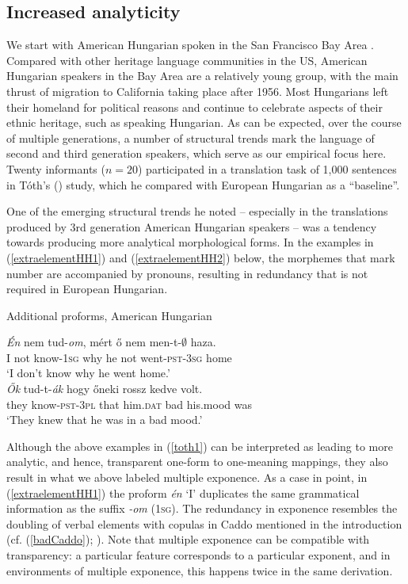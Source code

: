\documentclass[output=paper,colorlinks,citecolor=brown,footheight=42pt]{langscibook}
\begin{document}
\subsection{Increased analyticity} \label{analsub}
We start with American Hungarian spoken in the San Francisco Bay Area \citep{toth2007hungry}. Compared with other heritage language communities in the US, American Hungarian speakers in the Bay Area are a relatively young group, with the main thrust of migration to California taking place after 1956. Most Hungarians left their homeland for political reasons and continue to celebrate aspects of their ethnic heritage, such as speaking Hungarian. As can be expected, over the course of multiple generations, a number of structural trends mark the language of second and third generation speakers, which serve as our empirical focus here. Twenty informants ($n=20$) participated in a translation task of 1,000 sentences in T\'{o}th's (\citeyear{toth2007hungry}) study, which he compared with European Hungarian as a “baseline”.

One of the emerging structural trends he noted -- especially in the translations produced by 3rd generation American Hungarian speakers -- was a tendency towards producing more analytical morphological forms. In the examples in (\ref{extraelementHH1}) and (\ref{extraelementHH2}) below, the morphemes that mark number are accompanied by pronouns, resulting in redundancy that is not required in European Hungarian. 

\begin{exe}
\ex Additional proforms, American Hungarian  \citep[169]{toth2007hungry} \label{toth1}
\begin{xlist}
\ex\label{extraelementHH1}
\gll \emph{Én} nem tud-\emph{om}, m\'{e}rt \H{o} nem men-t-$\emptyset$ haza.\\
I not know\textsc{-1sg} why he not went\textsc{-pst-3sg} home\\
\glt `I don't know why he went home.'\\
\ex\label{extraelementHH2}
\gll \emph{\H{O}k} tud-t-\emph{ák} hogy \H{o}neki rossz kedve volt.\\
they know\textsc{-pst-3pl} that him.\textsc{dat} bad his.mood was\\
\glt `They knew that he was in a bad mood.'\\
\end{xlist}
\end{exe}

Although the above examples in (\ref{toth1}) can be interpreted as leading to more analytic, and hence, transparent one-form to one-meaning mappings, they also result in what we above labeled multiple exponence. As a case in point, in (\ref{extraelementHH1}) the proform \textit{\'{e}n} `I' duplicates the same grammatical information as the suffix \textit{-om} (1\textsc{sg}). The redundancy in exponence resembles the doubling of verbal elements with copulas in Caddo mentioned in the introduction (cf. (\ref{badCaddo}); \citealt{chafe76,melnar2005}). Note that multiple exponence can be compatible with transparency: a particular feature corresponds to a particular exponent, and in environments of multiple exponence, this happens twice in the same derivation.
\end{document}
